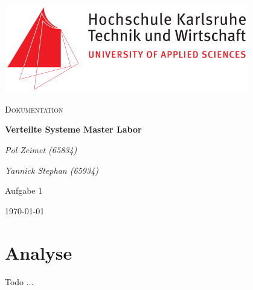 \documentclass[12pt,a4paper]{article}
\begin{document}
	\begin{titlepage}
		\centering
		\includegraphics[width=0.8\textwidth]{img/Hska_logo.png}\par\vspace{1cm}
		{\scshape\LARGE Dokumentation\par}
		\vspace{1.5cm}
		{\huge\bfseries Verteilte Systeme Master Labor\par}
		\vspace{2cm}
		{\Large\itshape Pol Zeimet (65834)\par}
		{\Large\itshape Yannick Stephan (65934)\par}
		\vfill
		\large Aufgabe 1
		
		\vfill
		
		{\large \today\par}
	\end{titlepage}

	\section{Analyse}
	Todo ...
\end{document}
